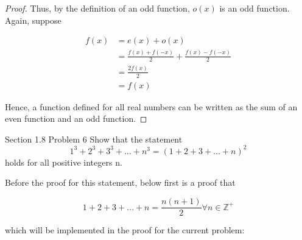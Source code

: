 \documentclass{article}
\begin{document}
\begin{proof}
        \noindent Thus, by the definition of an odd function, $o(x)$ is an odd function. Again, suppose

        \begin{align*}
            f(x)    &= e(x) + o(x) \\
                    &= \frac{f(x)+f(-x)}{2} + \frac{f(x)-f(-x)}{2} \\
                    &= \frac{2f(x)}{2} \\
                    &= f(x)
        \end{align*}

        \noindent Hence, a function defined for all real numbers can be written as the sum of an even function and an odd function.

    \end{proof}

    \pagebreak
    \thispagestyle{page6}



    \begin{tbhtheorem}{Section 1.8 Problem 6}
        Show that the statement \\
        \begin{equation*}
            1^3 + 2^3 + 3^3 +\dots + n^3 = \left(1+2+3+\dots+n\right)^2
        \end{equation*}
        holds for all positive integers n.
    \end{tbhtheorem}

    \noindent Before the proof for this statement, below first is a proof that

    \[
        1 + 2 + 3 + \dots + n = \frac{n(n+1)}{2} \forall n\in\mathbb{Z}^+
    \]

    \noindent which will be implemented in the proof for the current problem: \\
\end{document}
